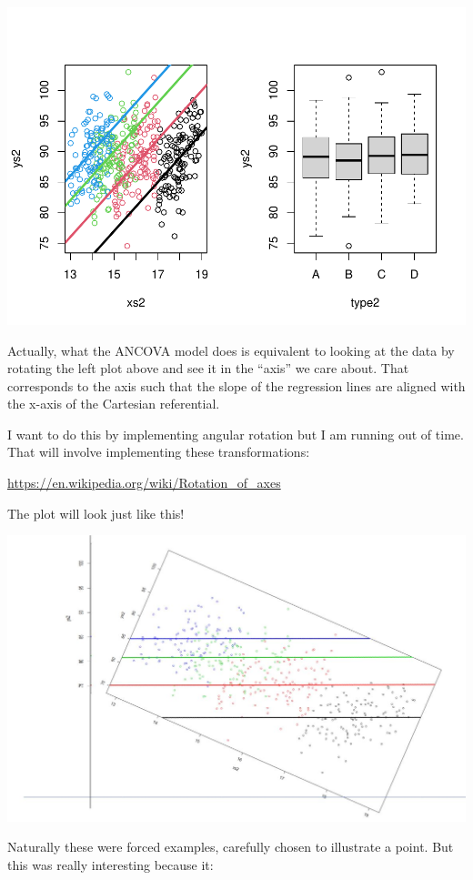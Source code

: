 \documentclass[
]{book}
\begin{document}
\includegraphics{ECOMODbook_files/figure-latex/a10.15-1.pdf}

Actually, what the ANCOVA model does is equivalent to looking at the data by rotating the left plot above and see it in the ``axis'' we care about. That corresponds to the axis such that the slope of the regression lines are aligned with the x-axis of the Cartesian referential.

I want to do this by implementing angular rotation but I am running out of time. That will involve implementing these transformations:

\url{https://en.wikipedia.org/wiki/Rotation_of_axes}

The plot will look just like this!

\includegraphics{FigPlotRotatedAula10.JPG}

Naturally these were forced examples, carefully chosen to illustrate a point. But this was really interesting because it:
\end{document}
